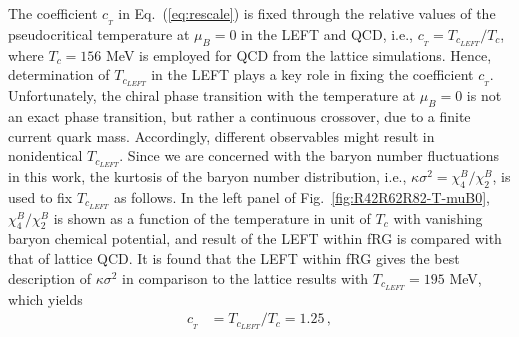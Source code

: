 \documentclass[%
reprint,
superscriptaddress,
showpacs,preprintnumbers,
 amsmath,amssymb,
 aps,
prd,
]{revtex4-1}
\def\Fig#1{Fig.~\ref{#1}} \def\Tab#1{Tab.~\ref{#1}}
\def\Eq#1{Eq.~(\ref{#1})}
\begin{document}
The coefficient $c_{_{T}}$ in \Eq{eq:rescale} is fixed through the relative values of the pseudocritical temperature at $\mu_B=0$ in the LEFT and QCD, i.e., $c_{_{T}}=T_{c_{LEFT}}/T_c$, where $T_c=156$ MeV is employed for QCD from the lattice simulations. Hence, determination of $T_{c_{LEFT}}$ in the LEFT plays a key role in fixing the coefficient $c_{_{T}}$. Unfortunately, the chiral phase transition with the temperature at $\mu_B=0$ is not an exact phase transition, but rather a continuous crossover, due to a finite current quark mass. Accordingly, different observables might result in nonidentical $T_{c_{LEFT}}$. Since we are concerned with the baryon number fluctuations in this work, the kurtosis of the baryon number distribution, i.e., $\kappa \sigma^2=\chi_4^{B}/\chi_2^{B}$, is used to fix $T_{c_{LEFT}}$ as follows. In the left panel of \Fig{fig:R42R62R82-T-muB0}, $\chi_4^{B}/\chi_2^{B}$ is shown as a function of the temperature in unit of $T_c$ with vanishing baryon chemical potential, and result of the LEFT within fRG is compared with that of lattice QCD. It is found that the LEFT within fRG gives the best description of $\kappa \sigma^2$ in comparison to the lattice results with $T_{c_{LEFT}}=195$ MeV, which yields  
\begin{align}
  c_{_{T}}&=T_{c_{LEFT}}/T_c=1.25\,,\label{}
\end{align}
\end{document}
